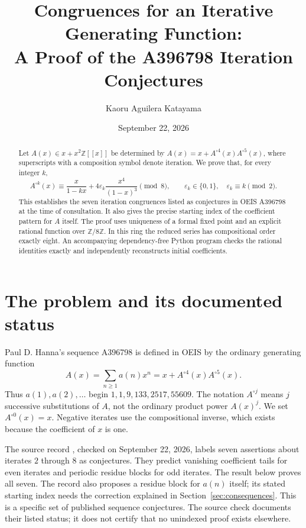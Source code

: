 \documentclass[11pt]{article}
\title{Congruences for an Iterative Generating Function:\\
  A Proof of the A396798 Iteration Conjectures}
\author{Kaoru Aguilera Katayama}
\date{September 22, 2026}
\theoremstyle{remark}
\newcommand{\Z}{\mathbb Z}
\newcommand{\eps}{\varepsilon}
\newcommand{\itn}[2]{{#1}^{\circ #2}}
\begin{document}
\maketitle

\begin{abstract}
Let $A(x)\in x+x^2\Z[[x]]$ be determined by
$A(x)=x+\itn{A}{4}(x)\itn{A}{5}(x)$, where superscripts with a
composition symbol denote iteration. We prove that, for every integer $k$,
\[
\itn{A}{k}(x)\equiv
\frac{x}{1-kx}+4\eps_k\frac{x^4}{(1-x)^3}\pmod 8,
\qquad \eps_k\in\{0,1\},\quad \eps_k\equiv k\pmod 2.
\]
This establishes the seven iteration congruences listed as conjectures in
OEIS A396798 at the time of consultation. It also gives the precise starting
index of the coefficient pattern for $A$ itself. The proof uses uniqueness
of a formal fixed point and an explicit rational function over
$\Z/8\Z$. In this ring the reduced series has compositional order exactly
eight. An accompanying dependency-free Python program checks the rational
identities exactly and independently reconstructs initial coefficients.
\end{abstract}

\section{The problem and its documented status}

Paul D. Hanna's sequence A396798 is defined in OEIS by the ordinary
generating function
\begin{equation}\label{eq:definition}
A(x)=\sum_{n\geq1}a(n)x^n
     =x+\itn{A}{4}(x)\itn{A}{5}(x).
\end{equation}
Thus $a(1),a(2),\ldots$ begin $1,1,9,133,2517,55609$.
The notation $\itn{A}{j}$ means $j$ successive substitutions of $A$,
not the ordinary product power $A(x)^j$. We set $\itn{A}{0}(x)=x$.
Negative iterates use the compositional inverse, which exists because
the coefficient of $x$ is one.

The source record \cite{oeis}, checked on September 22, 2026, labels
seven assertions about iterates $2$ through $8$ as conjectures. They
predict vanishing coefficient tails for even iterates and periodic
residue blocks for odd iterates. The result below proves all seven.
The record also proposes a residue block for $a(n)$ itself; its stated
starting index needs the correction explained in Section~\ref{sec:consequences}.
This is a specific set of published sequence conjectures. The source
check documents their listed status; it does not certify that no
unindexed proof exists elsewhere.
\end{document}

